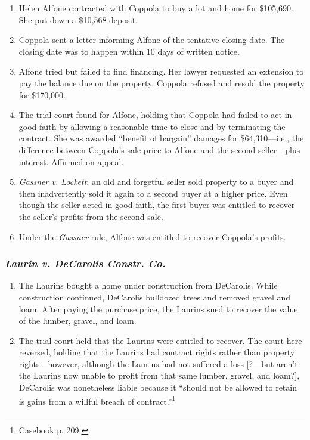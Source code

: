 \begin{enumerate}
    \item Helen Alfone contracted with Coppola to buy a lot and home for 
    \$105,690. She put down a \$10,568 deposit.
    \item Coppola sent a letter informing Alfone of the tentative closing 
    date. The closing date was to happen within 10 days of written notice.
    \item Alfone tried but failed to find financing. Her lawyer requested an 
    extension to pay the balance due on the property. Coppola refused and 
    resold the property for \$170,000.
    \item The trial court found for Alfone, holding that Coppola had failed to 
    act in good faith by allowing a reasonable time to close and by 
    terminating the contract. She was awarded ``benefit of bargain'' damages 
    for \$64,310---i.e., the difference between Coppola's sale price to Alfone 
    and the second seller---plus interest. Affirmed on appeal. 
    \item \emph{Gassner v. Lockett}: an old and forgetful seller sold property 
    to a buyer and then inadvertently sold it again to a second buyer at a 
    higher price. Even though the seller acted in good faith, the first buyer 
    was entitled to recover the seller's profits from the second sale.
    \item Under the \emph{Gassner} rule, Alfone was entitled to recover 
    Coppola's profits.
\end{enumerate}

\subsubsection{\emph{Laurin v. DeCarolis Constr. Co.}}

\begin{enumerate}
    \item The Laurins bought a home under construction from DeCarolis. While 
    construction continued, DeCarolis bulldozed trees and removed gravel and 
    loam. After paying the purchase price, the Laurins sued to recover the 
    value of the lumber, gravel, and loam.
    \item The trial court held that the Laurins were entitled to recover. The 
    court here reversed, holding that the Laurins had contract rights rather 
    than property rights---however, although the Laurins had not suffered a 
    loss [?---but aren't the Laurins now unable to profit from that same 
    lumber, gravel, and loam?], DeCarolis was nonetheless liable because it 
    ``should not be allowed to retain is gains from a willful breach of 
    contract.''\footnote{Casebook p. 209.}
\end{enumerate}

